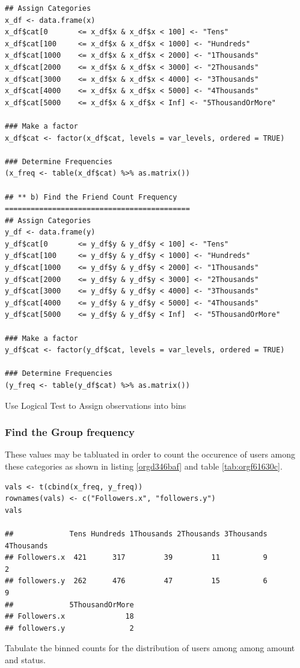 \documentclass[11pt]{article}
\begin{document}
\begin{listing}[htbp]
\begin{verbatim}
## Assign Categories
x_df <- data.frame(x)
x_df$cat[0       <= x_df$x & x_df$x < 100] <- "Tens"
x_df$cat[100     <= x_df$x & x_df$x < 1000] <- "Hundreds"
x_df$cat[1000    <= x_df$x & x_df$x < 2000] <- "1Thousands"
x_df$cat[2000    <= x_df$x & x_df$x < 3000] <- "2Thousands"
x_df$cat[3000    <= x_df$x & x_df$x < 4000] <- "3Thousands"
x_df$cat[4000    <= x_df$x & x_df$x < 5000] <- "4Thousands"
x_df$cat[5000    <= x_df$x & x_df$x < Inf] <- "5ThousandOrMore"

### Make a factor
x_df$cat <- factor(x_df$cat, levels = var_levels, ordered = TRUE)

### Determine Frequencies
(x_freq <- table(x_df$cat) %>% as.matrix())

## ** b) Find the Friend Count Frequency ===========================================
## Assign Categories
y_df <- data.frame(y)
y_df$cat[0       <= y_df$y & y_df$y < 100] <- "Tens"
y_df$cat[100     <= y_df$y & y_df$y < 1000] <- "Hundreds"
y_df$cat[1000    <= y_df$y & y_df$y < 2000] <- "1Thousands"
y_df$cat[2000    <= y_df$y & y_df$y < 3000] <- "2Thousands"
y_df$cat[3000    <= y_df$y & y_df$y < 4000] <- "3Thousands"
y_df$cat[4000    <= y_df$y & y_df$y < 5000] <- "4Thousands"
y_df$cat[5000    <= y_df$y & y_df$y < Inf]  <- "5ThousandOrMore"

### Make a factor
y_df$cat <- factor(y_df$cat, levels = var_levels, ordered = TRUE)

### Determine Frequencies
(y_freq <- table(y_df$cat) %>% as.matrix())
\end{verbatim}
\caption{\label{org9efa5d6}Use Logical Test to Assign observations into bins}
\end{listing}

\subsubsection{Find the Group frequency}
\label{sec:org01c5fb0}
These values may be tabluated in order to count the occurence of users among these categories as shown in listing \ref{orgd346baf} and table \ref{tab:orgf61630c}.

\begin{listing}[htbp]
\begin{verbatim}
vals <- t(cbind(x_freq, y_freq))
rownames(vals) <- c("Followers.x", "followers.y")
vals

##             Tens Hundreds 1Thousands 2Thousands 3Thousands 4Thousands
## Followers.x  421      317         39         11          9          2
## followers.y  262      476         47         15          6          9
##             5ThousandOrMore
## Followers.x              18
## followers.y               2
\end{verbatim}
\caption{\label{orgd346baf}Tabulate the binned counts for the distribution of users among among amount and status.}
\end{listing}
\end{document}
